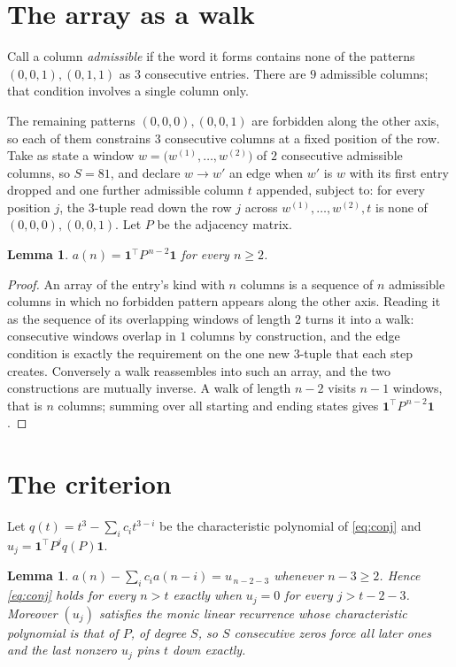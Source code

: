 \documentclass[11pt,a4paper]{article}
\theoremstyle{plain}
\newtheorem{lemma}[theorem]{Lemma}
\theoremstyle{definition}
\begin{document}
\section{The array as a walk}

Call a column \emph{admissible} if the word it forms contains none of the patterns
$(0,0,1), (0,1,1)$ as $3$ consecutive entries. There are $9$ admissible columns; that condition
involves a single column only.

The remaining patterns $(0,0,0), (0,0,1)$ are forbidden along the other axis, so each of them
constrains $3$ consecutive columns at a fixed position of the row. Take as state a
window $w=\bigl(w^{(1)},\dots,w^{(2)}\bigr)$ of $2$ consecutive admissible
columns, so $S=81$, and declare $w\to w'$ an edge when $w'$ is $w$ with its first entry
dropped and one further admissible column $t$ appended, subject to: for every position
$j$, the $3$-tuple read down the row $j$ across $w^{(1)},\dots,w^{(2)},t$
is none of $(0,0,0), (0,0,1)$. Let $P$ be the adjacency matrix.

\begin{lemma}\label{lem:walk}
$a(n)=\mathbf{1}^{\!\top}P^{\,n-2}\mathbf{1}$ for every $n\ge2$.
\end{lemma}

\begin{proof}
An array of the entry's kind with $n$ columns is a sequence of $n$ admissible columns in
which no forbidden pattern appears along the other axis. Reading it as the sequence of its
overlapping windows of length $2$ turns it into a walk: consecutive windows overlap in
$1$ columns by construction, and the edge condition is exactly the requirement on the one
new $3$-tuple that each step creates. Conversely a walk reassembles into such an array,
and the two constructions are mutually inverse. A walk of length $n-2$ visits $n-1$
windows, that is $n$ columns; summing over all starting and ending states gives
$\mathbf{1}^{\!\top}P^{\,n-2}\mathbf{1}$.
\end{proof}

\section{The criterion}

Let $q(t)=t^{3}-\sum_i c_i t^{3-i}$ be the characteristic polynomial of
\eqref{eq:conj} and $u_j=\mathbf{1}^{\!\top}P^{j}q(P)\mathbf{1}$.

\begin{lemma}\label{lem:crit}
$a(n)-\sum_i c_i a(n-i)=u_{\,n-2-3}$ whenever $n-3\ge2$. Hence
\eqref{eq:conj} holds for every $n>t$ exactly when $u_j=0$ for every
$j>t-2-3$. Moreover $(u_j)$ satisfies the monic linear recurrence whose
characteristic polynomial is that of $P$, of degree $S$, so $S$ consecutive zeros force all
later ones and the last nonzero $u_j$ pins $t$ down exactly.
\end{lemma}
\end{document}
